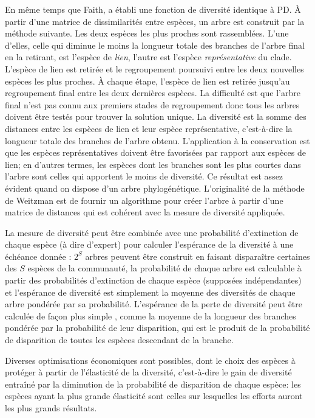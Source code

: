 \documentclass[
  11pt,
  french,
  a4paper,
  extrafontsizes,onecolumn,openright
  ]{memoir}
\begin{document}
En même temps que Faith, \textcite{Weitzman1992} a établi une fonction de diversité identique à PD.
À partir d'une matrice de dissimilarités entre espèces, un arbre est construit par la méthode suivante.
Les deux espèces les plus proches sont rassemblées.
L'une d'elles, celle qui diminue le moins la longueur totale des branches de l'arbre final en la retirant, est l'espèce de \emph{lien}, l'autre est l'espèce \emph{représentative} du clade.
L'espèce de lien est retirée et le regroupement poursuivi entre les deux nouvelles espèces les plus proches.
À chaque étape, l'espèce de lien est retirée jusqu'au regroupement final entre les deux dernières espèces.
La difficulté est que l'arbre final n'est pas connu aux premiers stades de regroupement donc tous les arbres doivent être testés pour trouver la solution unique.
La diversité est la somme des distances entre les espèces de lien et leur espèce représentative, c'est-à-dire la longueur totale des branches de l'arbre obtenu.
L'application à la conservation est que les espèces représentatives doivent être favorisées par rapport aux espèces de lien; en d'autres termes, les espèces dont les branches sont les plus courtes dans l'arbre sont celles qui apportent le moins de diversité.
Ce résultat est assez évident quand on dispose d'un arbre phylogénétique.
L'originalité de la méthode de Weitzman est de fournir un algorithme pour créer l'arbre à partir d'une matrice de distances qui est cohérent avec la mesure de diversité appliquée.

La mesure de diversité peut être combinée avec une probabilité d'extinction de chaque espèce (à dire d'expert) pour calculer l'espérance de la diversité à une échéance donnée \autocite{Weitzman1993}: \(2^S\) arbres peuvent être construit en faisant disparaître certaines des \(S\) espèces de la communauté, la probabilité de chaque arbre est calculable à partir des probabilités d'extinction de chaque espèce (supposées indépendantes) et l'espérance de diversité est simplement la moyenne des diversités de chaque arbre pondérée par sa probabilité.
L'espérance de la perte de diversité peut être calculée de façon plus simple \autocite{Witting1995}, comme la moyenne de la longueur des branches pondérée par la probabilité de leur disparition, qui est le produit de la probabilité de disparition de toutes les espèces descendant de la branche.

Diverses optimisations économiques sont possibles, dont le choix des espèces à protéger à partir de l'élasticité de la diversité, c'est-à-dire le gain de diversité entraîné par la diminution de la probabilité de disparition de chaque espèce: les espèces ayant la plus grande élasticité sont celles sur lesquelles les efforts auront les plus grands résultats.
\end{document}
